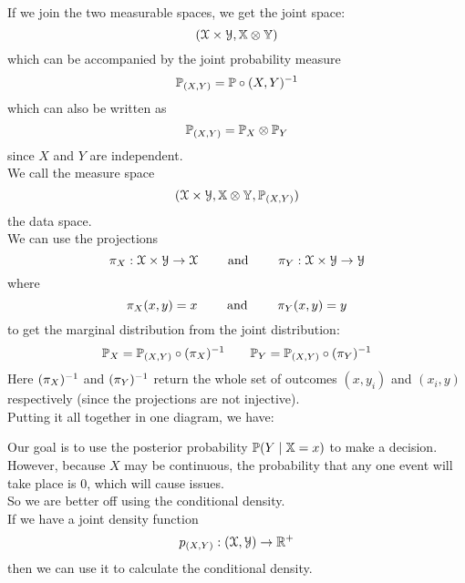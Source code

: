 \documentclass[12pt]{article}
\begin{document}
If we join the two measurable spaces,
we get the joint space:
\[ (\mathcal{X} \times \mathcal{Y},
\mathbb{X} \otimes \mathbb{Y}) \]
which can be accompanied by the
joint probability measure
\[ \mathbb{P}_{(X, Y)}
= \mathbb{P} \circ (X, Y)^{-1} \]
which can also be written as
\[ \mathbb{P}_{(X, Y)} 
= \mathbb{P}_X \otimes \mathbb{P}_Y \]
since $X$ and $Y$ are independent. \\

We call the measure space
\[ (\mathcal{X} \times \mathcal{Y},
\mathbb{X} \otimes \mathbb{Y}, \mathbb{P}_{(X, Y)}) \]
the data space. \\

We can use the projections
\[ \pi_X: \mathcal{X} \times \mathcal{Y} \to \mathcal{X} 
\qquad \text{ and } \qquad 
\pi_Y: \mathcal{X} \times \mathcal{Y} \to \mathcal{Y} \]
where
\[ \pi_X(x, y) = x \qquad \text{ and } \qquad \pi_Y(x, y) = y \]
to get the marginal distribution
from the joint distribution:
\[ \mathbb{P}_X = \mathbb{P}_{(X, Y)}
\circ (\pi_X)^{-1} \qquad 
\mathbb{P}_Y = \mathbb{P}_{(X, Y)} \circ 
(\pi_Y)^{-1} \] 
Here $(\pi_X)^{-1}$ and $(\pi_Y)^{-1}$
return the whole set of
outcomes $(x, y_i)$
and $(x_i, y)$
respectively (since the projections
are not injective). \\

Putting it all together in one
diagram, we have:

Our goal is to use the posterior
probability $\mathbb{P}(Y \mid \mathbb{X} = x)$
to make a decision.
However, because $X$
may be continuous,
the probability that any one event
will take place is $0$,
which will cause issues. \\
So we are better off using the 
conditional density. \\

If we have a joint density function
\[p_{(X, Y)}: (\mathcal{X}, \mathcal{Y}) \to \mathbb{R}^+ \]
then we can use it to calculate
the conditional density. \\
\end{document}
